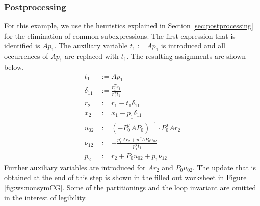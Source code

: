 \subsubsection{Postprocessing}

For this example, we use the heuristics explained in Section \ref{sec:postprocessing} for the elimination of common subexpressions. The first expression that is identified is $A p_1$. The auxiliary variable $t_1 := A p_1$ is introduced and all occurrences of $A p_1$ are replaced with $t_1$. The resulting assignments are shown below.
%
\begin{align*}
t_1 &:= A p_1 \\
\delta_{11} &:= \frac{r_1^T r_1}{r_1^T t_1} \\
r_2 &:= r_1 - t_1 \delta_{11} \\
x_2 &:= x_1 - p_1 \delta_{11} \\
u_{02} &:= \left(- P_0^T A P_0 \right)^{-1} \cdot P_0^T A r_2 \\
\nu_{12} &:= - \frac{p_1^T A r_2 + p_1^T A P_0 u_{02}}{p_1^T t_1} \\
p_2 &:= r_2 + P_0 u_{02} + p_1 \nu_{12}
\end{align*}
%
Further auxiliary variables are introduced for $A r_2$ and $P_0 u_{02}$. The update that is obtained at the end of this step is shown in the filled out worksheet in Figure \ref{fig:ws:nonsymCG}. Some of the partitionings and the loop invariant are omitted in the interest of legibility.
%
